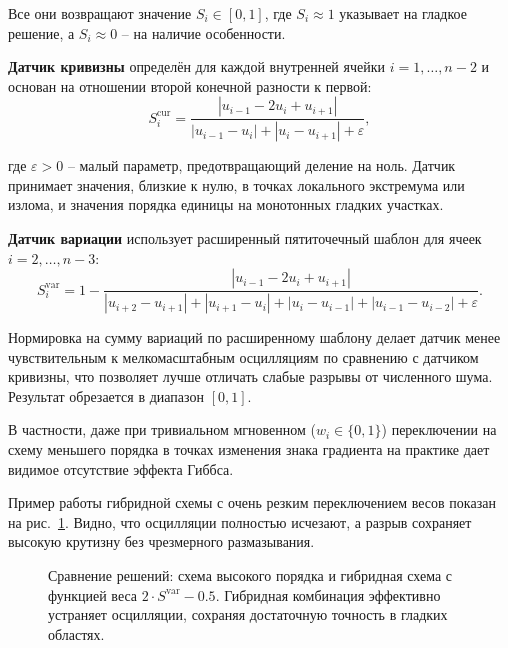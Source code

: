 \documentclass[14pt]{report}
\begin{document}
Все они возвращают значение $S_i \in [0,1]$, где $S_i \approx 1$ указывает на гладкое решение, а $S_i \approx 0$ -- на наличие особенности.

\textbf{Датчик кривизны} определён для каждой внутренней ячейки $i = 1,\dots,n-2$ и основан на отношении второй конечной разности к первой:
\begin{equation}
S_i^{\text{cur}} = \frac{|u_{i-1} - 2u_i + u_{i+1}|}{|u_{i-1} - u_i| + |u_i - u_{i+1}| + \varepsilon},
\end{equation}

где $\varepsilon > 0$ -- малый параметр, предотвращающий деление на ноль. Датчик принимает значения, близкие к нулю, в точках локального экстремума или излома, и значения порядка единицы на монотонных гладких участках.

\textbf{Датчик вариации} использует расширенный пятиточечный шаблон для ячеек $i = 2,\dots,n-3$:
\begin{equation}
S_i^{\text{var}} = 1 - \frac{|u_{i-1} - 2u_i + u_{i+1}|}{|u_{i+2} - u_{i+1}| + |u_{i+1} - u_i| + |u_i - u_{i-1}| + |u_{i-1} - u_{i-2}| + \varepsilon}.
\end{equation}

Нормировка на сумму вариаций по расширенному шаблону делает датчик менее чувствительным к мелкомасштабным осцилляциям по сравнению с датчиком кривизны, что позволяет лучше отличать слабые разрывы от численного шума. Результат обрезается в диапазон $[0, 1]$.

В частности, даже при тривиальном мгновенном ($w_i \in \{0, 1\}$) переключении на схему меньшего порядка в точках изменения знака градиента на практике дает видимое отсутствие эффекта Гиббса.

Пример работы гибридной схемы с очень резким переключением весов показан на рис.~\ref{fig:hybrid}. Видно, что осцилляции полностью исчезают, а разрыв сохраняет высокую крутизну без чрезмерного размазывания.

\begin{figure}[ht]
    \centering
    
    \caption{Сравнение решений: схема высокого порядка и гибридная схема с функцией веса $2\cdot S^{\text{var}} - 0.5$. Гибридная комбинация эффективно устраняет осцилляции, сохраняя достаточную точность в гладких областях.}
    \label{fig:hybrid}
\end{figure}

\begin{table}[h]
    \centering
    
    
    
    \label{tab:hybrid-global-erros}
    \caption{Интегральные ошибки в норме $L_2$ различных схем (с разными датчиками осцилляций) на различных профилях.}
\end{table}
\end{document}
